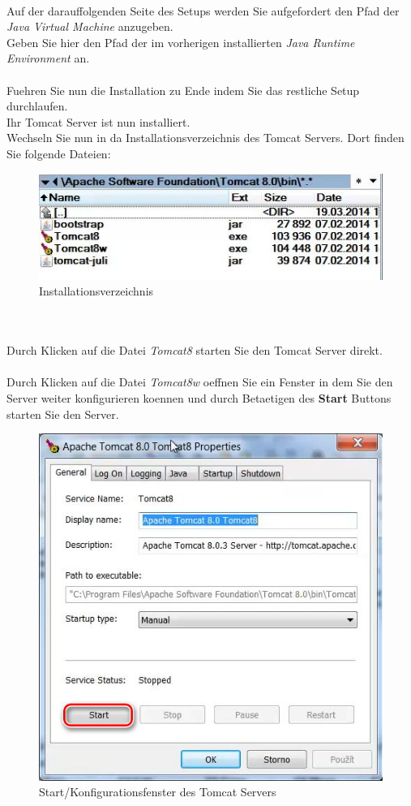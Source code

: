 \documentclass[a4paper, 12pt]{scrreprt}
\begin{document}
\newpage
\ \\
Auf der darauffolgenden Seite des Setups werden Sie aufgefordert den Pfad der {\it Java Virtual Machine} anzugeben.\\
Geben Sie hier den Pfad der im vorherigen installierten {\it Java Runtime Environment} an.\\
\ \\
Fuehren Sie nun die Installation zu Ende indem Sie das restliche Setup durchlaufen.\\
Ihr Tomcat Server ist nun installiert.
\ \\
Wechseln Sie nun in da Installationsverzeichnis des Tomcat Servers. Dort finden Sie folgende Dateien:
\begin{figure}[h]
\centering
\includegraphics[width=0.8\linewidth]{Grafiken/TomcatDirectory}
\caption{Installationsverzeichnis}
\label{fig:TomcatDirectory}
\end{figure}\\
\newpage
\ \\
Durch Klicken auf die Datei {\it Tomcat8} starten Sie den Tomcat Server direkt.\\
\ \\
Durch Klicken auf die Datei {\it Tomcat8w} oeffnen Sie ein Fenster in dem Sie den Server weiter konfigurieren koennen und durch 
Betaetigen des \textbf{Start} Buttons starten Sie den Server.
\begin{figure}[h]
\centering
\includegraphics[width=0.8\linewidth]{Grafiken/TomcatStartup}
\caption{Start/Konfigurationsfenster des Tomcat Servers}
\label{fig:TomcatStartup}
\end{figure}
\end{document}
